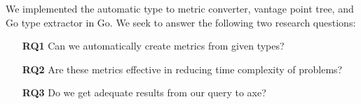 We implemented the automatic type to metric converter,
vantage point tree,
and Go type extractor in Go\cite{github}.
We seek to answer the following two research questions:
\begin{itemize}
    \item[\textbf{RQ1}] Can we automatically create metrics from given types?
    \item[\textbf{RQ2}] Are these metrics effective in reducing time complexity of problems?
    \item[\textbf{RQ3}] Do we get adequate results from our query to axe?
\end{itemize}